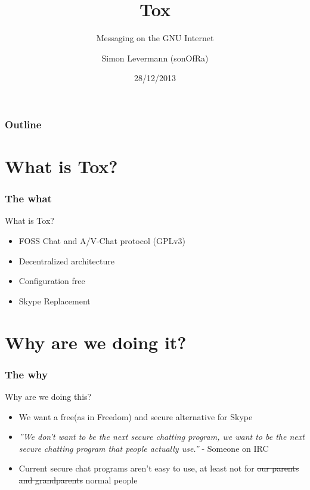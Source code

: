 \documentclass{mybeamer}
\title{Tox}
\subtitle{Messaging on the GNU Internet}
\author{Simon Levermann (sonOfRa)}
\institute{The Tox Team}
\date{28/12/2013}
\begin{document}
    \setfooterempty
    \begin{frame}
    \titlepage
    \end{frame} 

    \setcounter{framenumber}{0}
    \begin{frame}
    \frametitle{Outline}
    \tableofcontents
    \end{frame}

    \section{What is Tox?}
    \begin{frame}
        \frametitle{The what}
        \begin{block}{What is Tox?}
            \begin{itemize}
                \item FOSS Chat and A/V-Chat protocol (GPLv3)
                \item Decentralized architecture
                \item Configuration free
                \item Skype Replacement
            \end{itemize}
        \end{block}
    \end{frame}

    \section{Why are we doing it?}
    \begin{frame}
        \frametitle{The why}
        \begin{block}{Why are we doing this?}
            \begin{itemize}
                \item We want a free(as in Freedom) and secure alternative for Skype
                \item \textit{''We don't want to be the next secure chatting program, we want to be the next secure chatting program that people actually use.''} - Someone on IRC
                \item Current secure chat programs aren't easy to use, at least not for \sout{our parents and grandparents} normal people
            \end{itemize}
        \end{block}
    \end{frame}
\end{document}
